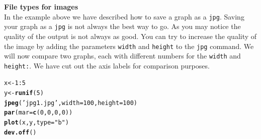 \documentclass{article}\usepackage[]{graphicx}\usepackage[]{color}
\makeatletter
\newcommand{\hlnum}[1]{\textcolor[rgb]{0.686,0.059,0.569}{#1}}%
\newcommand{\hlstr}[1]{\textcolor[rgb]{0.192,0.494,0.8}{#1}}%
\newcommand{\hlopt}[1]{\textcolor[rgb]{0,0,0}{#1}}%
\newcommand{\hlstd}[1]{\textcolor[rgb]{0.345,0.345,0.345}{#1}}%
\newcommand{\hlkwb}[1]{\textcolor[rgb]{0.69,0.353,0.396}{#1}}%
\newcommand{\hlkwc}[1]{\textcolor[rgb]{0.333,0.667,0.333}{#1}}%
\newcommand{\hlkwd}[1]{\textcolor[rgb]{0.737,0.353,0.396}{\textbf{#1}}}%
\newenvironment{kframe}{%
 \def\at@end@of@kframe{}%
 \ifinner\ifhmode%
  \def\at@end@of@kframe{\end{minipage}}%
  \begin{minipage}{\columnwidth}%
 \fi\fi%
 \def\FrameCommand##1{\hskip\@totalleftmargin \hskip-\fboxsep
 \colorbox{shadecolor}{##1}\hskip-\fboxsep
     \hskip-\linewidth \hskip-\@totalleftmargin \hskip\columnwidth}%
 \MakeFramed {\advance\hsize-\width
   \@totalleftmargin\z@ \linewidth\hsize
   \@setminipage}}%
 {\par\unskip\endMakeFramed%
 \at@end@of@kframe}
\newenvironment{knitrout}{}{} %
\makeatother
\begin{document}
\begin{mdframed}
\textbf{File types for images}\\
In the example above we have described how to save a graph as a \texttt{jpg}. Saving your graph as a \texttt{jpg} is not always the best way to go. As you may notice the quality of the output is not always as good. You can try to increase the quality of the image by adding the parameters \texttt{width} and \texttt{height} to the \texttt{jpg} command. We will now compare two graphs, each with different numbers for the \texttt{width} and \texttt{height:}. We have cut out the axis labels for comparison purposes.

\begin{knitrout}
\color{fgcolor}\begin{kframe}
\begin{alltt}
\hlstd{x}\hlkwb{<-}\hlnum{1}\hlopt{:}\hlnum{5}
\hlstd{y}\hlkwb{<-}\hlkwd{runif}\hlstd{(}\hlnum{5}\hlstd{)}
\hlkwd{jpeg}\hlstd{(}\hlstr{'jpg1.jpg'}\hlstd{,}\hlkwc{width}\hlstd{=}\hlnum{100}\hlstd{,}\hlkwc{height}\hlstd{=}\hlnum{100}\hlstd{)}
\hlkwd{par}\hlstd{(}\hlkwc{mar}\hlstd{=}\hlkwd{c}\hlstd{(}\hlnum{0}\hlstd{,}\hlnum{0}\hlstd{,}\hlnum{0}\hlstd{,}\hlnum{0}\hlstd{))}
\hlkwd{plot}\hlstd{(x,y,}\hlkwc{type}\hlstd{=}\hlstr{"b"}\hlstd{)}
\hlkwd{dev.off}\hlstd{()}


\end{alltt}
\end{kframe}
\end{knitrout}
\end{mdframed}
\end{document}
